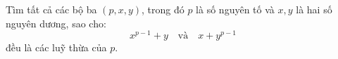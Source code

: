 \ifshowproblem
\begin{problem}\label{example:FRA-2015-TST4-P9}
    Tìm tất cả các bộ ba \( (p, x, y) \), trong đó \( p \) là số nguyên tố và \( x, y \) là hai số nguyên dương, sao cho:
    \[
        x^{p-1} + y \quad \text{và} \quad x + y^{p-1}
    \]
    đều là các luỹ thừa của \( p \).
\end{problem}
\fi

\fi